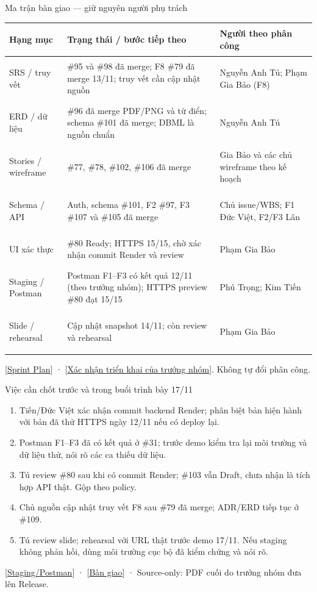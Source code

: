 \documentclass[aspectratio=169,10pt]{beamer}
\begin{document}
\begin{frame}{Ma trận bàn giao — giữ nguyên người phụ trách}
\scriptsize
  \begin{tabularx}{\textwidth}{>{\bfseries\raggedright\arraybackslash}p{2.15cm} >{\raggedright\arraybackslash}X >{\raggedright\arraybackslash}p{2.55cm}}
    \toprule
    Hạng mục & Trạng thái / bước tiếp theo & Người theo phân công \\
    \midrule
    SRS / truy vết & \#95 và \#98 đã merge; F8 \#79 đã merge 13/11; truy vết cần cập nhật nguồn & Nguyễn Anh Tú; Phạm Gia Bảo (F8) \\
    ERD / dữ liệu & \#96 đã merge PDF/PNG và từ điển; schema \#101 đã merge; DBML là nguồn chuẩn & Nguyễn Anh Tú \\
    Stories / wireframe & \#77, \#78, \#102, \#106 đã merge & Gia Bảo và các chủ wireframe theo kế hoạch \\
    Schema / API & Auth, schema \#101, F2 \#97, F3 \#107 và \#105 đã merge & Chủ issue/WBS; F1 Đức Việt, F2/F3 Lân \\
    UI xác thực & \#80 Ready; HTTPS 15/15, chờ xác nhận commit Render và review & Phạm Gia Bảo \\
    Staging / Postman & Postman F1--F3 có kết quả 12/11 (theo trưởng nhóm); HTTPS preview \#80 đạt 15/15 & Phú Trọng; Kim Tiến \\
    Slide / rehearsal & Cập nhật snapshot 14/11; còn review và rehearsal & Phạm Gia Bảo \\
    \bottomrule
  \end{tabularx}
  \vfill
  \scriptsize [\href{https://github.com/Ktin06/it3180_nhom6_gym_management/blob/main/docs/plans/sprint-1-tien-do.md}{Sprint Plan}] · [\href{https://github.com/Ktin06/it3180_nhom6_gym_management/issues/31\#issuecomment-6653959733}{Xác nhận triển khai của trưởng nhóm}]. Không tự đổi phân công.
\end{frame}

\begin{frame}{Việc cần chốt trước và trong buổi trình bày 17/11}
\begin{enumerate}
    \item Tiến/Đức Việt xác nhận commit backend Render; phân biệt bản hiện hành với bản đã thử HTTPS ngày 12/11 nếu có deploy lại.
    \item Postman F1--F3 đã có kết quả ở \#31; trước demo kiểm tra lại môi trường và dữ liệu thử, nói rõ các ca thiếu dữ liệu.
    \item Tú review \#80 sau khi có commit Render; \#103 vẫn Draft, chưa nhận là tích hợp API thật. Gộp theo policy.
    \item Chủ nguồn cập nhật truy vết F8 sau \#79 đã merge; ADR/ERD tiếp tục ở \#109.
    \item Tú review slide; rehearsal với URL thật trước demo 17/11. Nếu staging không phản hồi, dùng môi trường cục bộ đã kiểm chứng và nói rõ.
  \end{enumerate}
  \vfill
  \small [\href{https://github.com/Ktin06/it3180_nhom6_gym_management/issues/31}{Staging/Postman}] · [\href{https://github.com/Ktin06/it3180_nhom6_gym_management/issues/32}{Bàn giao}] · Source-only: PDF cuối do trưởng nhóm đưa lên Release.
\end{frame}
\end{document}

